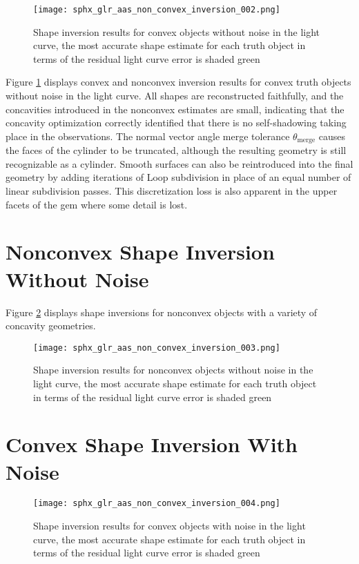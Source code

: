 \begin{figure}[!htb]
  \centering
  \texttt{[image: sphx\_glr\_aas\_non\_convex\_inversion\_002.png]}
  \caption{Shape inversion results for convex objects without noise in the light curve, the most accurate shape estimate for each truth object in terms of the residual light curve error is shaded green}
  \label{fig:res_convex_no_noise}
\end{figure}

Figure \ref{fig:res_convex_no_noise} displays convex and nonconvex inversion results for convex truth objects without noise in the light curve. All shapes are reconstructed faithfully, and the concavities introduced in the nonconvex estimates are small, indicating that the concavity optimization correctly identified that there is no self-shadowing taking place in the observations. The normal vector angle merge tolerance $\theta_\mathrm{merge}$ causes the faces of the cylinder to be truncated, although the resulting geometry is still recognizable as a cylinder. Smooth surfaces can also be reintroduced into the final geometry by adding iterations of Loop subdivision in place of an equal number of linear subdivision passes. This discretization loss is also apparent in the upper facets of the gem where some detail is lost. 

\clearpage
\section{Nonconvex Shape Inversion Without Noise}

Figure \ref{fig:res_nonconvex_no_noise} displays shape inversions for nonconvex objects with a variety of concavity geometries. 

\begin{figure}[!htb]
  \centering
  \texttt{[image: sphx\_glr\_aas\_non\_convex\_inversion\_003.png]}
  \caption{Shape inversion results for nonconvex objects without noise in the light curve, the most accurate shape estimate for each truth object in terms of the residual light curve error is shaded green}
  \label{fig:res_nonconvex_no_noise}
\end{figure}

\clearpage
\section{Convex Shape Inversion With Noise}

\begin{figure}[!htb]
  \centering
  \texttt{[image: sphx\_glr\_aas\_non\_convex\_inversion\_004.png]}
  \caption{Shape inversion results for convex objects with noise in the light curve, the most accurate shape estimate for each truth object in terms of the residual light curve error is shaded green}
  \label{fig:res_convex_with_noise}
\end{figure}

